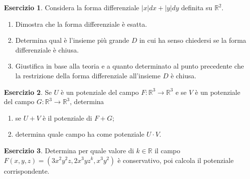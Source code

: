 \documentclass[12pt,a4paper]{article}
\theoremstyle{definition}
\newtheorem{exe}{Esercizio}
\begin{document}
\begin{exe}
    Considera la forma differenziale $|x| dx + |y| dy$ definita su $\mathbb{R}^2$.
    \begin{enumerate}
        \item Dimostra che la forma differenziale è esatta.
        \item Determina qual è l'insieme più grande $D$ in cui ha senso chiedersi se la forma differenziale è chiusa.
        \item Giustifica in base alla teoria e a quanto determinato al punto precedente che la restrizione della forma differenziale all'insieme $D$ è chiusa.
    \end{enumerate}
\end{exe}

\begin{exe}
    Se $U$ è un potenziale del campo $F : \mathbb{R}^3 \to \mathbb{R}^3$ e se $V$ è un potenziale del campo $G : \mathbb{R}^3 \to \mathbb{R}^3$, determina
    \begin{enumerate}
        \item se $U+V$ è il potenziale di $F+G$;
        \item determina quale campo ha come potenziale $U \cdot V$.
    \end{enumerate}
\end{exe}

\begin{exe}
    Determina per quale valore di $k \in \mathbb{R}$ il campo $F(x,y,z) = (3x^2 y^2 z, 2x^3 y z^k, x^3 y^2)$ è conservativo, poi calcola il potenziale corrispondente.
\end{exe}
\end{document}
